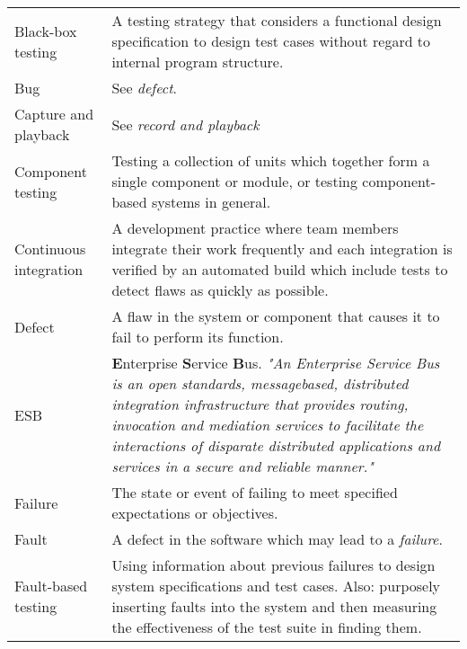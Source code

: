 \documentclass[12pt,a4paper,oneside,pdftex]{report}
\begin{document}
\begin{longtable}{@{}p{}p{}@{}}

Black-box testing & A testing strategy that considers a functional design specification to design test cases without regard to internal program structure. \citep{burnstein2003practical} \\[0.3cm]

Bug & See \emph{defect}. \\[0.3cm]

Capture and playback & See \emph{record and playback} \\[0.8cm]

Component testing & Testing a collection of units which together form a single component or module, or testing component-based systems in general. \citep{wu2003uml, ieee2010systems} \\[0.3cm]

Continuous integration & A development practice where team members integrate their work frequently and each integration is verified by an automated build which include tests to detect flaws as quickly as possible. \citep{fowler2006continuous} \\[0.3cm]

Defect & A flaw in the system or component that causes it to fail to perform its function. \citep{burnstein2003practical, ieee2010systems} \\[0.3cm]

ESB & \textbf{E}nterprise \textbf{S}ervice \textbf{B}us. \emph{"An Enterprise Service Bus is an open standards, messagebased, distributed integration infrastructure that provides routing, invocation and mediation services to facilitate the interactions of disparate distributed applications and services in a secure and reliable manner."} \citep{menge2007enterprise} \\[0.3cm]

Failure & The state or event of failing to meet specified expectations or objectives. \citep{ieee2010systems} \\[0.3cm]

Fault & A defect in the software which may lead to a \emph{failure}. \citep{ieee2010systems} \\[0.3cm] 

Fault-based testing & Using information about previous failures to design system specifications and test cases. Also: purposely inserting faults into the system and then measuring the effectiveness of the test suite in finding them. \citep{pezze2008software} \\[0.3cm]  


\end{longtable}
\end{document}
